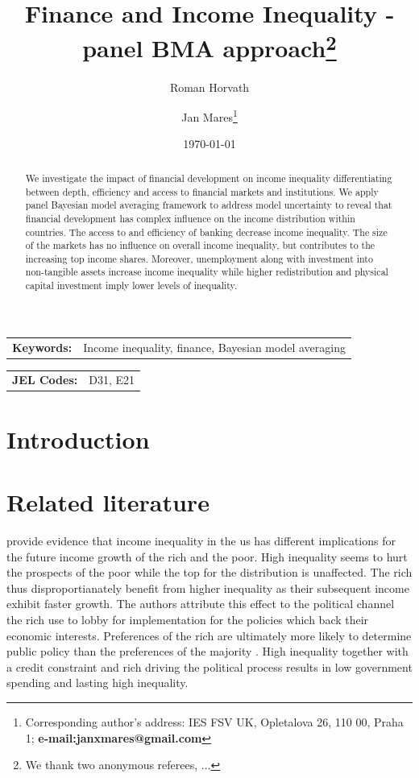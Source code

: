 \documentclass[a4paper,11pt]{article}
\title{Finance and Income Inequality - panel BMA approach\thanks{We thank two anonymous referees, ...}}
\author[a]{Roman Horvath}
\author[a]{Jan Mares\footnote{\footnotesize Corresponding author's address: IES FSV UK, Opletalova 26, 110 00, Praha 1; \textbf{e-mail:janxmares@gmail.com}}}
\affil[a]{Charles University, Prague}
\date{\today}
\begin{document}
\def\sym#1{\ifmmode^{#1}\else\(^{#1}\)\fi} %

\maketitle

\thispagestyle{empty}
\begin{abstract}
    We investigate the impact of financial development on income inequality differentiating between depth, efficiency and access to financial markets and institutions. We apply panel Bayesian model averaging framework to address model uncertainty to reveal that financial development has complex influence on the income distribution within countries. The access to and efficiency of banking decrease income inequality. The size of the markets has no influence on overall income inequality, but contributes to the increasing top income shares. Moreover, unemployment along with investment into non-tangible assets increase income inequality while higher redistribution and physical capital investment imply lower levels of inequality.
\end{abstract}

\bigskip

\begin{tabular}{p{0.25\hsize}p{0.6\hsize}} %
\textbf{Keywords:} & Income inequality, finance, Bayesian model averaging
\end{tabular}

\bigskip

\begin{tabular}{p{0.25\hsize}p{0.6\hsize}}
\textbf{JEL Codes:} & D31, E21\\
\end{tabular}

\clearpage
\setcounter{page}{1}

\section{Introduction}

\section{Related literature}
\citet{pikettyandzucman2014}
\citet{van2018inequality} provide evidence that income inequality in the \ac{us} has different implications for the future income growth of the rich and the poor. High inequality seems to hurt the prospects of the poor while the top for the distribution is unaffected. The rich thus disproportianately benefit from higher inequality as their subsequent income exhibit faster growth. The authors attribute this effect to the political channel the rich use to lobby for implementation for the policies which back their economic interests. Preferences of the rich  are ultimately more likely to determine public policy than the preferences of the majority \citep{gilens_page_2014}. High inequality together with a credit constraint and rich driving the political process results in low government spending and lasting high inequality.
\end{document}
